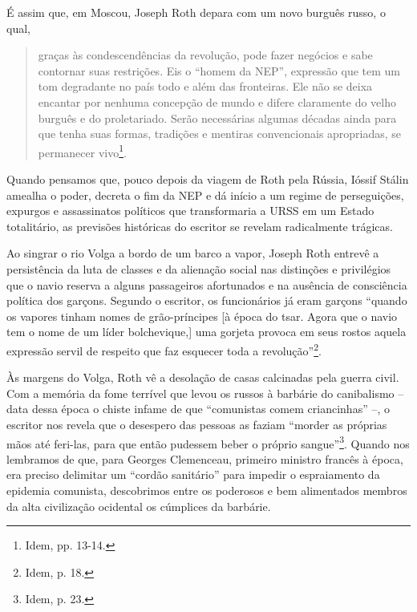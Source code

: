 É assim que, em Moscou, Joseph Roth depara com um novo burguês russo, o
qual,

\begin{quote}
graças às condescendências da revolução, pode fazer negócios e sabe
contornar suas restrições. Eis o ``homem da NEP'', expressão que tem um
tom degradante no país todo e além das fronteiras. Ele não se deixa
encantar por nenhuma concepção de mundo e difere claramente do velho
burguês e do proletariado. Serão necessárias algumas décadas ainda para
que tenha suas formas, tradições e mentiras convencionais apropriadas,
se permanecer vivo\footnote{Idem, pp. 13-14.}.
\end{quote}

Quando pensamos que, pouco depois da viagem de Roth pela Rússia, Ióssif
Stálin amealha o poder, decreta o fim da NEP e dá início a um regime de
perseguições, expurgos e assassinatos políticos que transformaria a URSS
em um Estado totalitário, as previsões históricas do escritor se revelam
radicalmente trágicas.

Ao singrar o rio Volga a bordo de um barco a vapor, Joseph Roth entrevê
a persistência da luta de classes e da alienação social nas distinções e
privilégios que o navio reserva a alguns passageiros afortunados e na
ausência de consciência política dos garçons. Segundo o escritor, os
funcionários já eram garçons ``quando os vapores tinham nomes de
grão-príncipes {[}à época do tsar. Agora que o navio tem o nome de um
líder bolchevique,{]} uma gorjeta provoca em seus rostos aquela
expressão servil de respeito que faz esquecer toda a
revolução''\footnote{Idem, p. 18.}.

Às margens do Volga, Roth vê a desolação de casas calcinadas pela guerra
civil. Com a memória da fome terrível que levou os russos à barbárie do
canibalismo -- data dessa época o chiste infame de que ``comunistas
comem criancinhas'' --, o escritor nos revela que o desespero das
pessoas as faziam ``morder as próprias mãos até feri-las, para que então
pudessem beber o próprio sangue''\footnote{Idem, p. 23.}. Quando nos
lembramos de que, para Georges Clemenceau, primeiro ministro francês à
época, era preciso delimitar um ``cordão sanitário'' para impedir o
espraiamento da epidemia comunista, descobrimos entre os poderosos e bem
alimentados membros da alta civilização ocidental os cúmplices da
barbárie.

